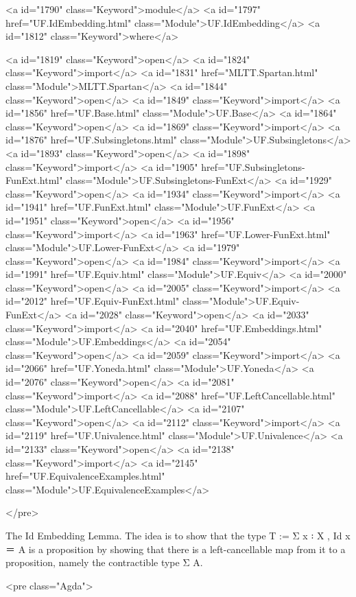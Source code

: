 <a id="1790" class="Keyword">module</a> <a id="1797" href="UF.IdEmbedding.html" class="Module">UF.IdEmbedding</a> <a id="1812" class="Keyword">where</a>

<a id="1819" class="Keyword">open</a> <a id="1824" class="Keyword">import</a> <a id="1831" href="MLTT.Spartan.html" class="Module">MLTT.Spartan</a>
<a id="1844" class="Keyword">open</a> <a id="1849" class="Keyword">import</a> <a id="1856" href="UF.Base.html" class="Module">UF.Base</a>
<a id="1864" class="Keyword">open</a> <a id="1869" class="Keyword">import</a> <a id="1876" href="UF.Subsingletons.html" class="Module">UF.Subsingletons</a>
<a id="1893" class="Keyword">open</a> <a id="1898" class="Keyword">import</a> <a id="1905" href="UF.Subsingletons-FunExt.html" class="Module">UF.Subsingletons-FunExt</a>
<a id="1929" class="Keyword">open</a> <a id="1934" class="Keyword">import</a> <a id="1941" href="UF.FunExt.html" class="Module">UF.FunExt</a>
<a id="1951" class="Keyword">open</a> <a id="1956" class="Keyword">import</a> <a id="1963" href="UF.Lower-FunExt.html" class="Module">UF.Lower-FunExt</a>
<a id="1979" class="Keyword">open</a> <a id="1984" class="Keyword">import</a> <a id="1991" href="UF.Equiv.html" class="Module">UF.Equiv</a>
<a id="2000" class="Keyword">open</a> <a id="2005" class="Keyword">import</a> <a id="2012" href="UF.Equiv-FunExt.html" class="Module">UF.Equiv-FunExt</a>
<a id="2028" class="Keyword">open</a> <a id="2033" class="Keyword">import</a> <a id="2040" href="UF.Embeddings.html" class="Module">UF.Embeddings</a>
<a id="2054" class="Keyword">open</a> <a id="2059" class="Keyword">import</a> <a id="2066" href="UF.Yoneda.html" class="Module">UF.Yoneda</a>
<a id="2076" class="Keyword">open</a> <a id="2081" class="Keyword">import</a> <a id="2088" href="UF.LeftCancellable.html" class="Module">UF.LeftCancellable</a>
<a id="2107" class="Keyword">open</a> <a id="2112" class="Keyword">import</a> <a id="2119" href="UF.Univalence.html" class="Module">UF.Univalence</a>
<a id="2133" class="Keyword">open</a> <a id="2138" class="Keyword">import</a> <a id="2145" href="UF.EquivalenceExamples.html" class="Module">UF.EquivalenceExamples</a>

</pre>

The Id Embedding Lemma. The idea is to show that the type
T := Σ x ꞉ X , Id x ＝ A is a proposition by showing that there is a
left-cancellable map from it to a proposition, namely the contractible
type Σ A.

<pre class="Agda">

